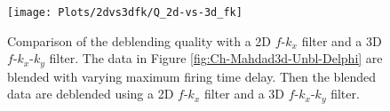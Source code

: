\begin{figure}
	\centering
	\texttt{[image: Plots/2dvs3dfk/Q\_2d-vs-3d\_fk]}
	\caption{Comparison of the deblending quality with a 2D $f$-$k_x$ filter and a 3D $f$-$k_x$-$k_y$ filter. The data in Figure \ref{fig:Ch-Mahdad3d-Unbl-Delphi} are blended with varying maximum firing time delay. Then the blended data are deblended using a 2D $f$-$k_x$ filter and a 3D $f$-$k_x$-$k_y$ filter.}
	\label{fig:Ch-Mahdad3d-2dvs3dfk}
\end{figure}


















